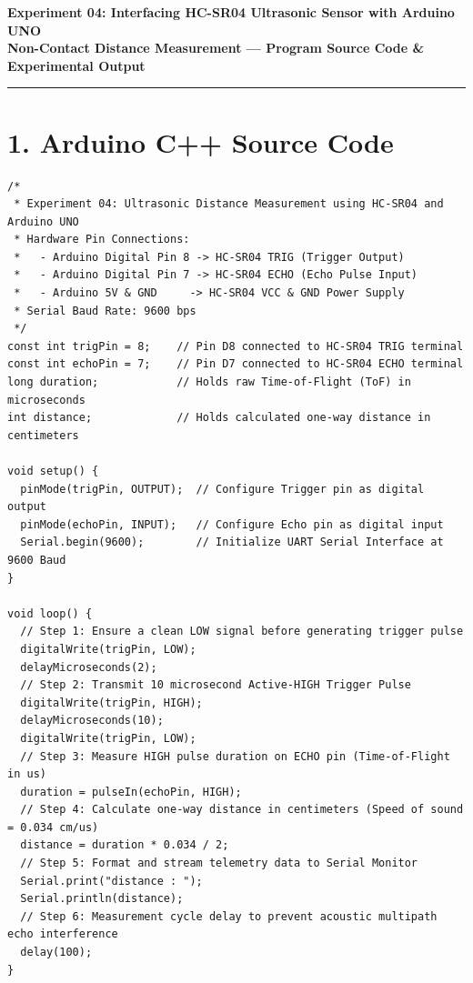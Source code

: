 \documentclass[11pt,a4paper]{article}
\begin{document}
\begin{center}
    {\Large\bfseries Experiment 04: Interfacing HC-SR04 Ultrasonic Sensor with Arduino UNO}\\[0.10cm]
    {\normalsize\textbf{Non-Contact Distance Measurement --- Program Source Code \& Experimental Output}}
\end{center}
\vspace{-0.20cm}
\rule{\textwidth}{0.9pt}
\vspace{0.06cm}

\section*{1. Arduino C++ Source Code}

\begin{lstlisting}[style=bwArduino, title={\textbf{Listing 4.1: Microcontroller Firmware for Ultrasonic Distance Measurement.}}]
/*
 * Experiment 04: Ultrasonic Distance Measurement using HC-SR04 and Arduino UNO
 * Hardware Pin Connections:
 *   - Arduino Digital Pin 8 -> HC-SR04 TRIG (Trigger Output)
 *   - Arduino Digital Pin 7 -> HC-SR04 ECHO (Echo Pulse Input)
 *   - Arduino 5V & GND     -> HC-SR04 VCC & GND Power Supply
 * Serial Baud Rate: 9600 bps
 */
const int trigPin = 8;    // Pin D8 connected to HC-SR04 TRIG terminal
const int echoPin = 7;    // Pin D7 connected to HC-SR04 ECHO terminal
long duration;            // Holds raw Time-of-Flight (ToF) in microseconds
int distance;             // Holds calculated one-way distance in centimeters

void setup() {
  pinMode(trigPin, OUTPUT);  // Configure Trigger pin as digital output
  pinMode(echoPin, INPUT);   // Configure Echo pin as digital input
  Serial.begin(9600);        // Initialize UART Serial Interface at 9600 Baud
}

void loop() {
  // Step 1: Ensure a clean LOW signal before generating trigger pulse
  digitalWrite(trigPin, LOW);
  delayMicroseconds(2);
  // Step 2: Transmit 10 microsecond Active-HIGH Trigger Pulse
  digitalWrite(trigPin, HIGH);
  delayMicroseconds(10);
  digitalWrite(trigPin, LOW);
  // Step 3: Measure HIGH pulse duration on ECHO pin (Time-of-Flight in us)
  duration = pulseIn(echoPin, HIGH);
  // Step 4: Calculate one-way distance in centimeters (Speed of sound = 0.034 cm/us)
  distance = duration * 0.034 / 2;
  // Step 5: Format and stream telemetry data to Serial Monitor
  Serial.print("distance : ");
  Serial.println(distance);
  // Step 6: Measurement cycle delay to prevent acoustic multipath echo interference
  delay(100);
}
\end{lstlisting}
\end{document}
